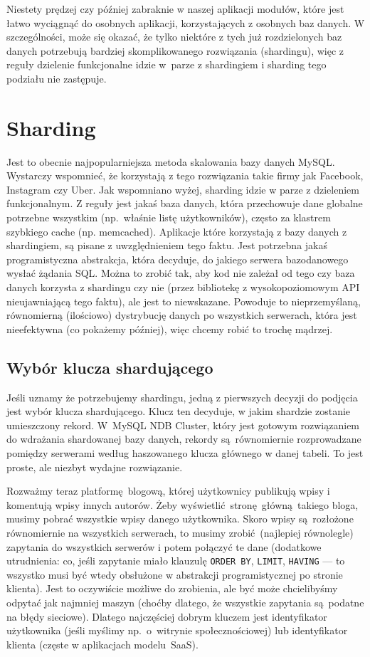 \documentclass[a4paper,12pt]{article}
\begin{document}
Niestety prędzej czy później zabraknie w naszej aplikacji modułów, które jest łatwo wyciągnąć do osobnych aplikacji, korzystających z osobnych baz danych. W szczególności, może się okazać, że tylko niektóre z tych już rozdzielonych baz danych potrzebują bardziej skomplikowanego rozwiązania (shardingu), więc z reguły dzielenie funkcjonalne idzie w~parze z shardingiem i sharding tego podziału nie zastępuje.

\section{Sharding}

Jest to obecnie najpopularniejsza metoda skalowania bazy danych MySQL. Wystarczy wspomnieć, że korzystają z tego rozwiązania takie firmy jak Facebook, Instagram czy Uber. Jak wspomniano wyżej, sharding idzie w parze z dzieleniem funkcjonalnym. Z reguły jest jakaś baza danych, która przechowuje dane globalne potrzebne wszystkim (np.~właśnie listę użytkowników), często za klastrem szybkiego cache (np. memcached). Aplikacje które korzystają z bazy danych z shardingiem, są pisane z uwzględnieniem tego faktu. Jest potrzebna jakaś programistyczna abstrakcja, która decyduje, do jakiego serwera bazodanowego wysłać żądania SQL. Można to zrobić tak, aby kod nie zależał od tego czy baza danych korzysta z shardingu czy nie (przez bibliotekę z wysokopoziomowym API nieujawniającą tego faktu), ale jest to niewskazane. Powoduje to nieprzemyślaną, równomierną (ilościowo) dystrybucję danych po wszystkich serwerach, która jest nieefektywna (co pokażemy później), więc chcemy robić to trochę mądrzej.

\subsection{Wybór klucza shardującego}

Jeśli uznamy że potrzebujemy shardingu, jedną z pierwszych decyzji do podjęcia jest wybór klucza shardującego. Klucz ten decyduje, w jakim shardzie zostanie umieszczony rekord. W~MySQL NDB Cluster, który jest gotowym rozwiązaniem do wdrażania shardowanej bazy danych, rekordy są równomiernie rozprowadzane pomiędzy serwerami według haszowanego klucza głównego w danej tabeli. To jest proste, ale niezbyt wydajne rozwiązanie.

Rozważmy teraz platformę blogową, której użytkownicy publikują wpisy i komentują wpisy innych autorów. Żeby wyświetlić stronę główną takiego bloga, musimy pobrać wszystkie wpisy danego użytkownika. Skoro wpisy są rozłożone równomiernie na wszystkich serwerach, to musimy zrobić (najlepiej równolegle) zapytania do wszystkich serwerów i potem połączyć te dane (dodatkowe utrudnienia: co, jeśli zapytanie miało klauzulę \texttt{ORDER~BY}, \texttt{LIMIT}, \texttt{HAVING} --- to wszystko musi być wtedy obsłużone w abstrakcji programistycznej po stronie klienta). Jest to oczywiście możliwe do zrobienia, ale być może chcielibyśmy odpytać jak najmniej maszyn (choćby dlatego, że wszystkie zapytania są~podatne na błędy sieciowe). Dlatego najczęściej dobrym kluczem jest identyfikator użytkownika (jeśli myślimy np.~o~witrynie społecznościowej) lub identyfikator klienta (częste w aplikacjach modelu~SaaS).
\end{document}
